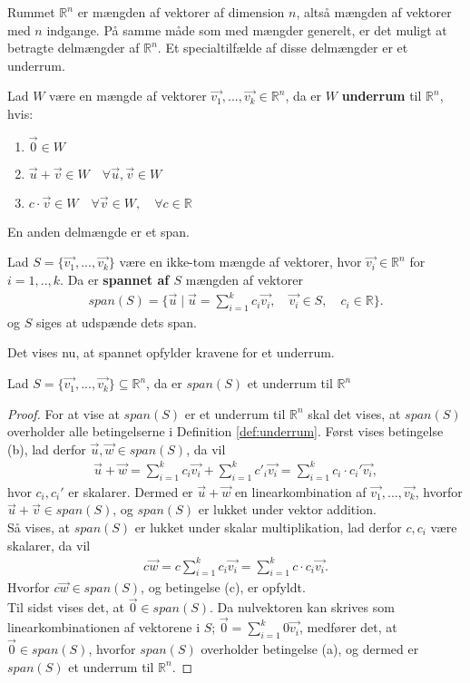 \newline
Rummet $\mathds{R}^n$ er mængden af vektorer af dimension $n$, altså mængden af vektorer med $n$ indgange. På samme måde som med mængder generelt, er det muligt at betragte delmængder af $\mathds{R}^n$.
Et specialtilfælde af disse delmængder er et underrum.
\begin{defn}[Underrum]
Lad $W$ være en mængde af vektorer $\vec{v_1},...,\vec{v_k} \in \mathds{R}^n$, da er $W$  \textbf{underrum} til $\mathds{R}^n$, hvis:
\begin{enumerate}[label=(\alph*)]
\item $\vec{0} \in W$
\item $\vec{u}+\vec{v} \in W \quad \forall \vec{u}, \vec{v} \in W$
\item $c \cdot \vec{v} \in W \quad \forall \vec{v} \in W, \quad \forall c \in \mathds{R}$
\end{enumerate}
\label{def:underrum}
\end{defn}
En anden delmængde er et span.
\begin{defn}[Span]
Lad $S=\{\vec{v_1},...,\vec{v_k}\}$ være en ikke-tom mængde af vektorer, hvor $\vec{v_i} \in \mathds{R}^n$ for $i = 1,..,k$. 
Da er \textbf{spannet af $S$} mængden af vektorer
\begin{align*}
span(S) = \{\vec{u} \mid \vec{u}=\sum_{i=1}^k c_i \vec{v_i}, \quad \vec{v_i} \in S, \quad c_i \in \mathds{R}\}.
\end{align*} 
og $S$ siges at udspænde dets span.
\label{def:span}
\end{defn}
Det vises nu, at spannet opfylder kravene for et underrum.
\begin{stn}
Lad $S=\{\vec{v_1},...,\vec{v_k}\} \subseteq \mathds{R}^n$, da er $span(S)$ et underrum til $\mathds{R}^n$
\label{stn:spanunderrum}
\end{stn}
\begin{proof}
For at vise at $span(S)$ er et underrum til $\mathds{R}^n$ skal det vises, at $span(S)$ overholder alle betingelserne i Definition \ref{def:underrum}.
Først vises betingelse (b), lad  derfor $\vec{u}, \vec{w} \in span(S)$, da vil 
\begin{align*}
\vec{u}+\vec{w}= \sum_{i=1}^k c_i \vec{v_i} + \sum_{i=1}^k c'_i \vec{v_i} = \sum_{i=1}^k c_i\cdot c_i' \vec{v_i},
\end{align*}
hvor $c_i, c_i'$ er skalarer.
Dermed er $\vec{u}+\vec{w}$ en linearkombination af $\vec{v_1},...,\vec{v_k}$, hvorfor $\vec{u}+\vec{v} \in span(S)$, og $span(S)$ er lukket under vektor addition.
\\ Så vises, at $span(S)$ er lukket under skalar multiplikation, lad derfor $c, c_i$ være skalarer, da vil
\begin{align*}
c\vec{w}= c\sum_{i=1}^k c_i \vec{v_i}  = \sum_{i=1}^k c \cdot c_i \vec{v_i}.
\end{align*}
Hvorfor $c\vec{w} \in span(S)$, og betingelse (c), er opfyldt.
\\Til sidst vises det, at $\vec{0} \in span(S)$.
Da nulvektoren kan skrives som linearkombinationen af vektorene i $S$; $\vec{0} = \sum_{i=1}^k 0 \vec{v_i}$, medfører det, at $\vec{0} \in span(S)$, hvorfor $span(S)$ overholder betingelse (a), og dermed er $span(S)$ et underrum til $\mathds{R}^n$.
\end{proof}
